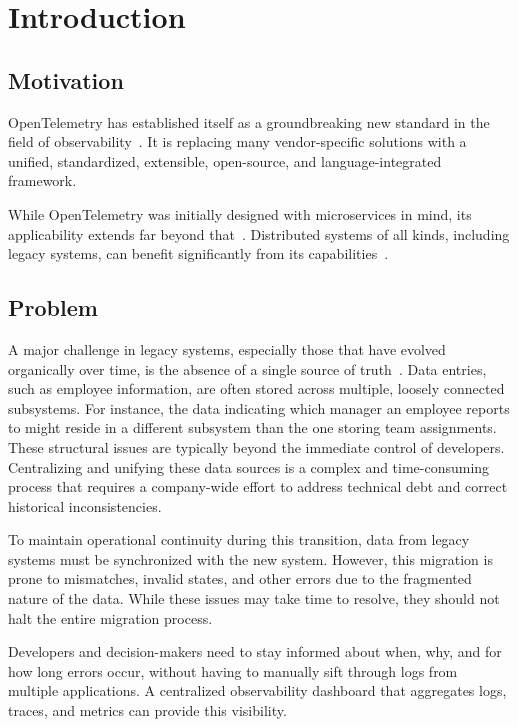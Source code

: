 \chapter{Introduction}
\label{chap:introduction}

\section{Motivation}
\label{sec:i_motivation}

OpenTelemetry has established itself as a groundbreaking new standard in the field of observability~.
It is replacing many vendor-specific solutions with a unified, standardized, extensible, open-source, 
and language-integrated framework.

While OpenTelemetry was initially designed with microservices in mind, its applicability extends far beyond that~.
Distributed systems of all kinds, including legacy systems, can benefit significantly from its capabilities~.

\section{Problem}
\label{sec:i_problem}

A major challenge in legacy systems, especially those that have evolved organically over time,
is the absence of a single source of truth~.
Data entries, such as employee information, are often stored across multiple, loosely connected subsystems.
For instance, the data indicating which manager an employee reports to might reside in a
different subsystem than the one storing team assignments.
These structural issues are typically beyond the immediate control of developers.
Centralizing and unifying these data sources is a complex and time-consuming process
that requires a company-wide effort to address technical debt and correct historical inconsistencies.

To maintain operational continuity during this transition, data from legacy systems must be synchronized with the new system.
However, this migration is prone to mismatches, invalid states, and other errors due to the fragmented nature of the data.
While these issues may take time to resolve, they should not halt the entire migration process.

Developers and decision-makers need to stay informed about when, why, and for how long errors
occur, without having to manually sift through logs from multiple applications.
A centralized observability dashboard that aggregates logs, traces, and metrics can provide this visibility.

